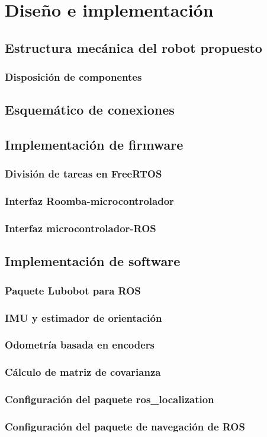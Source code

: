 \chapter{Diseño e implementación}

\label{Capitulo3}

\section{Estructura mecánica del robot propuesto}
\subsection{Disposición de componentes}
\section{Esquemático de conexiones}
\section{Implementación de firmware}
\subsection{División de tareas en FreeRTOS}
\subsection{Interfaz Roomba-microcontrolador}
\subsection{Interfaz microcontrolador-ROS}
\section{Implementación de software}
\subsection{Paquete Lubobot para ROS}
\subsection{IMU y estimador de orientación}
\subsection{Odometría basada en encoders}
\subsection{Cálculo de matriz de covarianza}
\subsection{Configuración del paquete ros\_localization}
\subsection{Configuración del paquete de navegación de ROS}
 